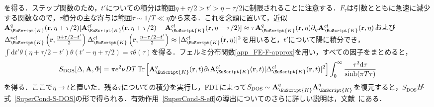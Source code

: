 \documentclass[a4paper,11pt]{ltjsarticle}
\def\rt{(\mathbf{r},t)}
\begin{document}
を得る．ステップ関数のため，$t'$についての積分は範囲$\eta+\tau/2>t'>\eta-\tau/2$に制限されることに注意する．$F_{\tau}$は引数とともに急速に減少する関数なので，$\tau$積分の主な寄与は範囲$\tau\sim 1/T\ll\eta$から来る．これを念頭に置いて，近似$\mathbf{A}^{q}_{\EuScript{K}}(\mathbf{r},\eta+\tau/2)
[\mathbf{A}^{cl}_{\EuScript{K}}(\mathbf{r},\eta+\tau/2)-
\mathbf{A}^{cl}_{\EuScript{K}}(\mathbf{r},\eta-\tau/2)]\approx\tau
\mathbf{A}^{q}_{\EuScript{K}}(\mathbf{r},\eta)\partial_{\eta}
\mathbf{A}^{cl}_{\EuScript{K}}(\mathbf{r},\eta)$および$\Delta^{*cl}_{\EuScript{K}}
\left(\mathbf{r},\frac{\eta+\tau/2-t'}{2}\right)
\Delta^{cl}_{\EuScript{K}}
\left(\mathbf{r},\frac{\eta-\tau/2-t'}{2}\right)
\approx|\Delta^{cl}_{\EuScript{K}}(\mathbf{r},\eta)|^{2}$を用いると，$t'$について陽に積分でき，$\int\mathrm{d}t'\theta(\eta+\tau/2-t')\theta(t'-\eta+\tau/2)=\tau\theta(\tau)$を得る．フェルミ分布関数\eqref{app_FE-F-approx}を用い，すべての因子をまとめると，
\begin{equation}
S_{\mathrm{DOS}}[\Delta,\mathbf{A},\Phi]=\pi e^{2}\nu DT\,
\mathrm{Tr}\left[ \mathbf{A}^{q}_{\EuScript{K}}\rt
\partial_{t}\mathbf{A}^{cl}_{\EuScript{K}}\rt
|\Delta^{cl}_{\EuScript{K}}\rt|^{2}\right] \int^{\infty}_{0}
\frac{\tau^{2}\mathrm{d}\tau}{\sinh(\pi T\tau)}
\end{equation}
を得る．ここで$\eta\rightarrow t$と置いた．残る$\tau$についての積分を実行し，FDTによって$S_{\mathrm{DOS}}\sim\mathbf{A}^{q}_{\EuScript{K}}\mathbf{A}^{q}_{\EuScript{K}}$を復元すると，$S_{\mathrm{DOS}}$が式~\eqref{SuperCond-S-DOS}の形で得られる．有効作用~\eqref{SuperCond-S-eff}の導出についてのさらに詳しい説明は，文献~\cite{LevchenkoKamenev}にある．

\newpage


\clearpage
\renewcommand{\refname}{\hyperlink{toc}{参考文献}}


\end{document}

